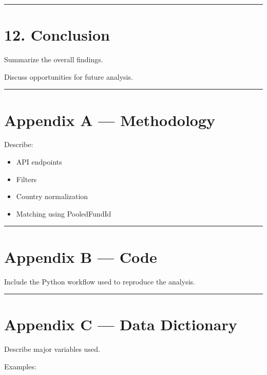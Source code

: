 \documentclass[
  11pt,
  letterpaper,
  DIV=11,
  numbers=noendperiod]{scrartcl}
\providecommand{\tightlist}{%
  \setlength{\itemsep}{0pt}\setlength{\parskip}{0pt}}
\begin{document}
\begin{center}\rule{0.5\linewidth}{0.5pt}\end{center}

\section{12. Conclusion}\label{conclusion}

Summarize the overall findings.

Discuss opportunities for future analysis.

\begin{center}\rule{0.5\linewidth}{0.5pt}\end{center}

\section{Appendix A --- Methodology}\label{appendix-a-methodology}

Describe:

\begin{itemize}
\tightlist
\item
  API endpoints
\item
  Filters
\item
  Country normalization
\item
  Matching using PooledFundId
\end{itemize}

\begin{center}\rule{0.5\linewidth}{0.5pt}\end{center}

\section{Appendix B --- Code}\label{appendix-b-code}

Include the Python workflow used to reproduce the analysis.

\begin{center}\rule{0.5\linewidth}{0.5pt}\end{center}

\section{Appendix C --- Data
Dictionary}\label{appendix-c-data-dictionary}

Describe major variables used.

Examples:
\end{document}
